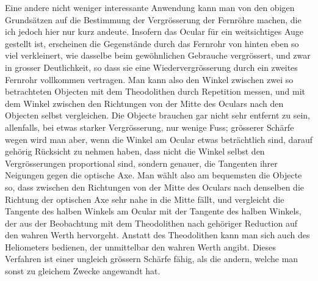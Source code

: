 Eine andere nicht weniger interessante Anwendung kann man von den obigen Grundsätzen auf die
Bestimmung der Vergrösserung der Fernröhre machen, die ich jedoch hier nur kurz andeute. Insofern das
Ocular für ein weitsichtiges Auge gestellt ist, erscheinen die Gegenstände durch das Fernrohr von
hinten eben so viel verkleinert, wie dasselbe beim gewöhnlichen Gebrauche vergrössert, und zwar in
grosser Deutlichkeit, so dass sie eine Wiedervergrösserung durch ein zweites Fernrohr vollkommen
vertragen. Man kann also den Winkel zwischen zwei so betrachteten Objecten mit dem Theodolithen durch
Repetition messen, und mit dem Winkel zwischen den Richtungen von der Mitte des Oculars nach den
Objecten selbst vergleichen. Die Objecte brauchen gar nicht sehr entfernt zu sein, allenfalls, bei
etwas starker Vergrösserung, nur wenige Fuss; grösserer Schärfe wegen wird man aber, wenn die Winkel
am Ocular etwas beträchtlich sind, darauf gehörig Rücksicht zu nehmen haben, dass nicht die Winkel
selbst den Vergrösserungen proportional sind, sondern genauer, die Tangenten ihrer Neigungen gegen
die optische Axe. Man wählt also am bequemsten die Objecte so, dass zwischen den Richtungen von der
Mitte des Oculars nach denselben die Richtung der optischen Axe sehr nahe in die Mitte fällt, und
vergleicht die Tangente des halben Winkels am Ocular mit der Tangente des halben Winkels, der aus der
Beobachtung mit dem Theodolithen nach gehöriger Reduction auf den wahren Werth hervorgeht. Anstatt des
Theodolithen kann man sich auch des Heliometers bedienen, der unmittelbar den wahren Werth angibt. 
Dieses Verfahren ist einer ungleich grössern Schärfe fähig, als die andern, welche man sonst zu
gleichem Zwecke angewandt hat.

